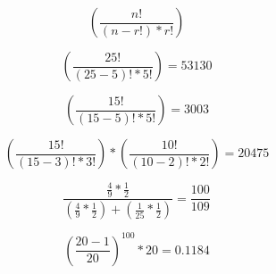 \documentclass[10pt]{book}
\begin{document}
\begin{mdSnippets}
\newcommand{\jacobi}[2]{\ensuremath{\left(\frac{#1}{#2}\right)}}

\begin{mdDisplaySnippet}[b2e69358e3ba43056385378b8301dded]%
\[%
\left(\frac {n!}  {(n-r!) * r!} \right)
\]%
\end{mdDisplaySnippet}%
\begin{mdDisplaySnippet}[65614c494414df0e37d1248688f6f599]%
\[%
\left(\frac {25!} {(25-5)! * 5!} \right) = 53130
\]%
\end{mdDisplaySnippet}%
\begin{mdDisplaySnippet}[dd18ca832c6e24f2eb5c3cc44d230bfe]%
\[%
\left(\frac {15!} {(15-5)! * 5!} \right) = 3003
\]%
\end{mdDisplaySnippet}%
\begin{mdDisplaySnippet}[ac48d040498964f6ff1c7ca631070388]%
\[%
\left(\frac {15!} {(15-3)! * 3!} \right) * \left(\frac {10!} {(10-2)! * 2!} \right) = 20475 
\]%
\end{mdDisplaySnippet}%
\begin{mdDisplaySnippet}%
\[%
{\frac {{\frac {4} {9}} * {\frac {1} {2}}} {\left({\frac {4} {9}} * {\frac {1} {2}}\right) + \left({\frac {1} {25}} * {\frac {1} {2}}\right)}}  = {\frac {100} {109}}
\]%
\end{mdDisplaySnippet}%
\begin{mdDisplaySnippet}[a5764fc97eb99f70e2764a86ae74bf28]%
\[%
\left({\frac {20-1} {20}}\right) ^ {100} * 20 = 0.1184
\]%
\end{mdDisplaySnippet}%

\end{mdSnippets}
\end{document}

